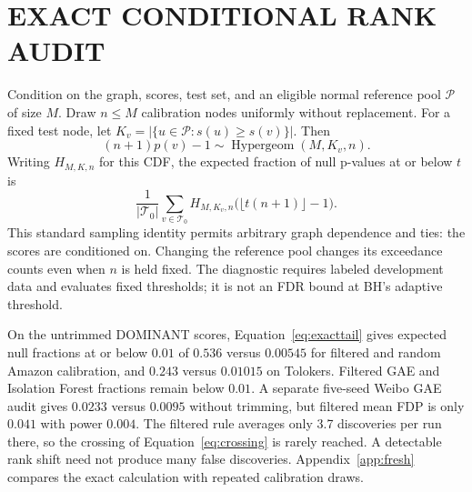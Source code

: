 \documentclass[twoside]{article}
\newcommand{\testset}{\mathcal{T}}
\begin{document}
\begin{table}[t]
\centering\footnotesize
\caption{Randomized WCS under each biased design and under uniform acquisition at approximately the same expected label budget: mean power, paired difference (uniform minus biased) with seed-clustered 95\% interval, and mean FDP under uniform acquisition. Bounds $\alpha m_0/m$ are $0.090$ on Amazon and Weibo and $0.095$ on T-Finance.}
\label{tab:uniform}
\end{table}

\clearpage\section{EXACT CONDITIONAL RANK AUDIT}
\label{app:rankaudit}
Condition on the graph, scores, test set, and an eligible normal reference pool $\mathcal P$ of size $M$. Draw $n\le M$ calibration nodes uniformly without replacement. For a fixed test node, let $K_v=|\{u\in\mathcal P:s(u)\ge s(v)\}|$. Then
\begin{equation}
(n+1)p(v)-1\sim\operatorname{Hypergeom}(M,K_v,n).
\label{eq:hypergeom}
\end{equation}
Writing $H_{M,K,n}$ for this CDF, the expected fraction of null p-values at or below $t$ is
\begin{equation}
\frac{1}{|\testset_0|}\sum_{v\in\testset_0}H_{M,K_v,n}\bigl(\lfloor t(n+1)\rfloor-1\bigr).
\label{eq:exacttail}
\end{equation}
This standard sampling identity permits arbitrary graph dependence and ties: the scores are conditioned on. Changing the reference pool changes its exceedance counts even when $n$ is held fixed. The diagnostic requires labeled development data and evaluates fixed thresholds; it is not an FDR bound at BH's adaptive threshold.

On the untrimmed DOMINANT scores, Equation~\eqref{eq:exacttail} gives expected null fractions at or below $0.01$ of $0.536$ versus $0.00545$ for filtered and random Amazon calibration, and $0.243$ versus $0.01015$ on Tolokers. Filtered GAE and Isolation Forest fractions remain below $0.01$. A separate five-seed Weibo GAE audit gives $0.0233$ versus $0.0095$ without trimming, but filtered mean FDP is only $0.041$ with power $0.004$. The filtered rule averages only 3.7 discoveries per run there, so the crossing of Equation~\eqref{eq:crossing} is rarely reached. A detectable rank shift need not produce many false discoveries. Appendix~\ref{app:fresh} compares the exact calculation with repeated calibration draws.
\end{document}
